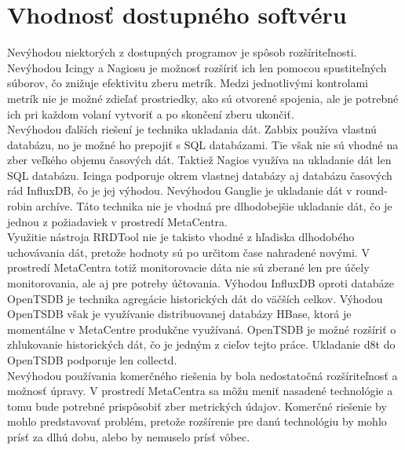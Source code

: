 \documentclass[12pt,twoside,color,cover,table]{fithesis3}
\begin{document}
\section{Vhodnosť dostupného softvéru}
Nevýhodou niektorých z dostupných programov je spôsob rozšíriteľnosti. Nevýhodou Icingy a Nagiosu je možnosť rozšíriť ich len pomocou spustiteľných súborov, čo znižuje efektivitu zberu metrík.
Medzi jednotlivými kontrolami metrík nie je možné zdieľať prostriedky, ako sú otvorené spojenia, ale je potrebné ich pri každom volaní vytvoriť a po skončení zberu ukončiť.
\\Nevýhodou ďalších riešení je technika ukladania dát. Zabbix používa vlastnú databázu, no je možné ho prepojiť s SQL databázami. Tie však nie sú vhodné na zber veľkého objemu časových dát. Taktiež Nagios
využíva na ukladanie dát len SQL databázu. Icinga podporuje okrem vlastnej databázy aj databázu časových rád InfluxDB, čo je jej výhodou. Nevýhodou Ganglie je ukladanie dát v round-robin archíve. Táto technika
nie je vhodná pre dlhodobejšie ukladanie dát, čo je jednou z požiadaviek v prostredí MetaCentra.
\\Využitie nástroja RRDTool nie je takisto vhodné z hľadiska dlhodobého uchovávania dát, pretože hodnoty sú po určitom čase nahradené novými. V prostredí MetaCentra totiž monitorovacie dáta nie sú zberané len 
pre účely monitorovania, ale aj pre potreby účtovania. Výhodou InfluxDB oproti databáze OpenTSDB je technika agregácie historických dát do väčších celkov. Výhodou OpenTSDB však je využívanie distribuovanej
databázy HBase, ktorá je momentálne v MetaCentre produkčne využívaná. OpenTSDB je možné rozšíriť o zhlukovanie historických dát, čo je jedným z cieľov tejto práce. Ukladanie d8t do OpenTSDB podporuje len collectd.
\\Nevýhodou používania komerčného riešenia by bola nedostatočná rozšíriteľnosť a možnosť úpravy. V prostredí MetaCentra sa môžu meniť nasadené technológie a tomu bude potrebné prispôsobiť zber 
metrických údajov. Komerčné riešenie by mohlo predstavovať problém, pretože rozšírenie pre danú technológiu by mohlo prísť za dlhú dobu, alebo by nemuselo prísť vôbec.
\end{document}
